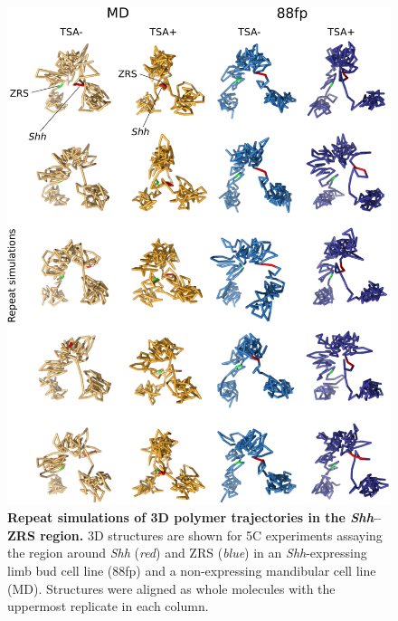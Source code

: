 \documentclass[a4paper,11pt,oneside]{book}
\begin{document}
\begin{figure}
\begin{center} 
\includegraphics[width=5.45in]{figs/3dreps.pdf}
\captionsetup{width=\textwidth} 
\caption[ Repeat simulations of 3D polymer trajectories in the \emph{Shh}--ZRS region. ]{ {\bf Repeat simulations of 3D polymer trajectories in the \emph{Shh}--ZRS region. }
3D structures are shown for 5C experiments assaying the region around \emph{Shh} (\emph{red}) and ZRS (\emph{blue}) in an \emph{Shh}-expressing limb bud cell line (88fp) and a non-expressing mandibular cell line (MD). Structures were aligned as whole molecules with the uppermost replicate in each column.
}\label{fig:3dreps}
\end{center} 
\end{figure} 
\end{document}
